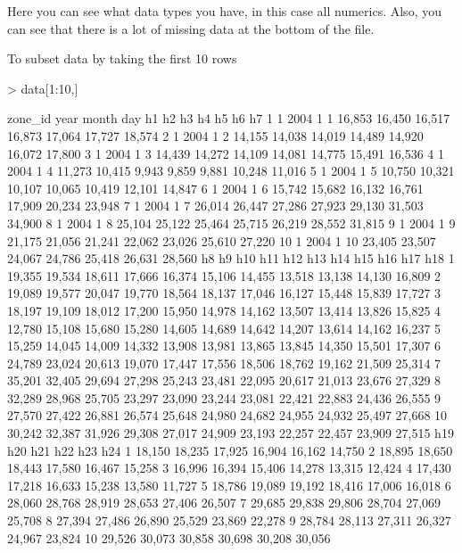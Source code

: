 \documentclass{article}
\begin{document}
Here you can see what data types you have, in this case all numerics.  Also, you can
see that there is a lot of missing data at the bottom of the file.  

To subset data by taking the first 10 rows

\begin{Schunk}
\begin{Sinput}
> data[1:10,]
\end{Sinput}
\begin{Soutput}
   zone_id year month day     h1     h2     h3     h4     h5     h6     h7
1        1 2004     1   1 16,853 16,450 16,517 16,873 17,064 17,727 18,574
2        1 2004     1   2 14,155 14,038 14,019 14,489 14,920 16,072 17,800
3        1 2004     1   3 14,439 14,272 14,109 14,081 14,775 15,491 16,536
4        1 2004     1   4 11,273 10,415  9,943  9,859  9,881 10,248 11,016
5        1 2004     1   5 10,750 10,321 10,107 10,065 10,419 12,101 14,847
6        1 2004     1   6 15,742 15,682 16,132 16,761 17,909 20,234 23,948
7        1 2004     1   7 26,014 26,447 27,286 27,923 29,130 31,503 34,900
8        1 2004     1   8 25,104 25,122 25,464 25,715 26,219 28,552 31,815
9        1 2004     1   9 21,175 21,056 21,241 22,062 23,026 25,610 27,220
10       1 2004     1  10 23,405 23,507 24,067 24,786 25,418 26,631 28,560
       h8     h9    h10    h11    h12    h13    h14    h15    h16    h17    h18
1  19,355 19,534 18,611 17,666 16,374 15,106 14,455 13,518 13,138 14,130 16,809
2  19,089 19,577 20,047 19,770 18,564 18,137 17,046 16,127 15,448 15,839 17,727
3  18,197 19,109 18,012 17,200 15,950 14,978 14,162 13,507 13,414 13,826 15,825
4  12,780 15,108 15,680 15,280 14,605 14,689 14,642 14,207 13,614 14,162 16,237
5  15,259 14,045 14,009 14,332 13,908 13,981 13,865 13,845 14,350 15,501 17,307
6  24,789 23,024 20,613 19,070 17,447 17,556 18,506 18,762 19,162 21,509 25,314
7  35,201 32,405 29,694 27,298 25,243 23,481 22,095 20,617 21,013 23,676 27,329
8  32,289 28,968 25,705 23,297 23,090 23,244 23,081 22,421 22,883 24,436 26,555
9  27,570 27,422 26,881 26,574 25,648 24,980 24,682 24,955 24,932 25,497 27,668
10 30,242 32,387 31,926 29,308 27,017 24,909 23,193 22,257 22,457 23,909 27,515
      h19    h20    h21    h22    h23    h24
1  18,150 18,235 17,925 16,904 16,162 14,750
2  18,895 18,650 18,443 17,580 16,467 15,258
3  16,996 16,394 15,406 14,278 13,315 12,424
4  17,430 17,218 16,633 15,238 13,580 11,727
5  18,786 19,089 19,192 18,416 17,006 16,018
6  28,060 28,768 28,919 28,653 27,406 26,507
7  29,685 29,838 29,806 28,704 27,069 25,708
8  27,394 27,486 26,890 25,529 23,869 22,278
9  28,784 28,113 27,311 26,327 24,967 23,824
10 29,526 30,073 30,858 30,698 30,208 30,056
\end{Soutput}
\end{Schunk}
\end{document}

